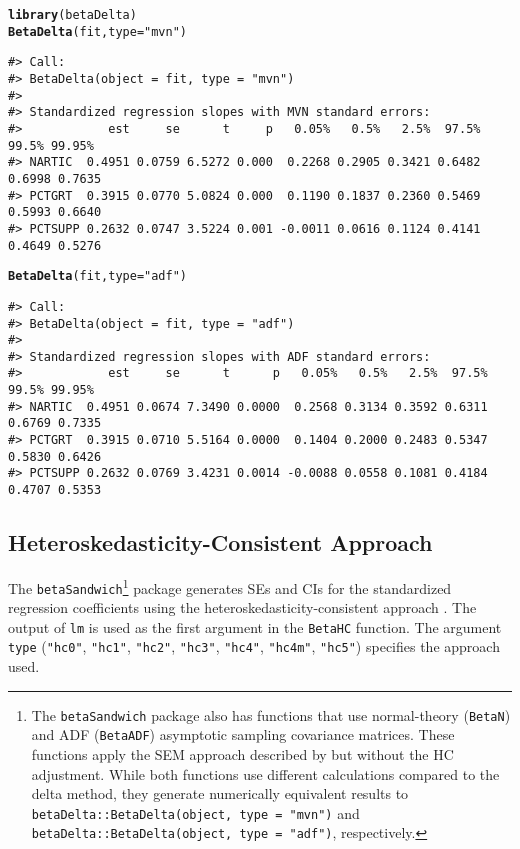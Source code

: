 \documentclass[man]{apa7}\usepackage[]{graphicx}\usepackage[]{xcolor}
\makeatletter
\newcommand{\hlstr}[1]{\textcolor[rgb]{0.192,0.494,0.8}{#1}}%
\newcommand{\hlstd}[1]{\textcolor[rgb]{0.345,0.345,0.345}{#1}}%
\newcommand{\hlkwc}[1]{\textcolor[rgb]{0.333,0.667,0.333}{#1}}%
\newcommand{\hlkwd}[1]{\textcolor[rgb]{0.737,0.353,0.396}{\textbf{#1}}}%
\newenvironment{kframe}{%
 \def\at@end@of@kframe{}%
 \ifinner\ifhmode%
  \def\at@end@of@kframe{\end{minipage}}%
  \begin{minipage}{\columnwidth}%
 \fi\fi%
 \def\FrameCommand##1{\hskip\@totalleftmargin \hskip-\fboxsep
 \colorbox{shadecolor}{##1}\hskip-\fboxsep
     \hskip-\linewidth \hskip-\@totalleftmargin \hskip\columnwidth}%
 \MakeFramed {\advance\hsize-\width
   \@totalleftmargin\z@ \linewidth\hsize
   \@setminipage}}%
 {\par\unskip\endMakeFramed%
 \at@end@of@kframe}
\newenvironment{knitrout}{}{} %
\makeatother
\begin{document}
\vspace{-.5em}
\begin{minipage}{.75\linewidth}
	\singlespacing
\begin{knitrout}\scriptsize
{}\color{fgcolor}\begin{kframe}
\begin{alltt}
\hlkwd{library}\hlstd{(betaDelta)}
\hlkwd{BetaDelta}\hlstd{(fit,} \hlkwc{type} \hlstd{=} \hlstr{"mvn"}\hlstd{)}
\end{alltt}
\begin{verbatim}
#> Call:
#> BetaDelta(object = fit, type = "mvn")
#>
#> Standardized regression slopes with MVN standard errors:
#>            est     se      t     p   0.05%   0.5%   2.5%  97.5%  99.5% 99.95%
#> NARTIC  0.4951 0.0759 6.5272 0.000  0.2268 0.2905 0.3421 0.6482 0.6998 0.7635
#> PCTGRT  0.3915 0.0770 5.0824 0.000  0.1190 0.1837 0.2360 0.5469 0.5993 0.6640
#> PCTSUPP 0.2632 0.0747 3.5224 0.001 -0.0011 0.0616 0.1124 0.4141 0.4649 0.5276
\end{verbatim}
\begin{alltt}
\hlkwd{BetaDelta}\hlstd{(fit,} \hlkwc{type} \hlstd{=} \hlstr{"adf"}\hlstd{)}
\end{alltt}
\begin{verbatim}
#> Call:
#> BetaDelta(object = fit, type = "adf")
#>
#> Standardized regression slopes with ADF standard errors:
#>            est     se      t      p   0.05%   0.5%   2.5%  97.5%  99.5% 99.95%
#> NARTIC  0.4951 0.0674 7.3490 0.0000  0.2568 0.3134 0.3592 0.6311 0.6769 0.7335
#> PCTGRT  0.3915 0.0710 5.5164 0.0000  0.1404 0.2000 0.2483 0.5347 0.5830 0.6426
#> PCTSUPP 0.2632 0.0769 3.4231 0.0014 -0.0088 0.0558 0.1081 0.4184 0.4707 0.5353
\end{verbatim}
\end{kframe}
\end{knitrout}
\end{minipage}

\subsection{Heteroskedasticity-Consistent Approach}

The \texttt{betaSandwich}\footnote{The \texttt{betaSandwich} package also has functions that use normal-theory (\texttt{BetaN}) and ADF (\texttt{BetaADF}) asymptotic sampling covariance matrices.
These functions apply the SEM approach described by \Textcite{Lib-Regression-Standardized-Coefficients-HC-Dudgeon-2017}
but without the HC adjustment.
While both functions use different calculations compared to the delta method, they generate numerically equivalent results to \texttt{betaDelta::BetaDelta(object, type = "mvn")} and \texttt{betaDelta::BetaDelta(object, type = "adf")}, respectively.} package
generates SEs and CIs
for the standardized regression coefficients
using the heteroskedasticity-consistent approach
\parencite{Lib-Regression-Standardized-Coefficients-HC-Dudgeon-2017}.
The output of \texttt{lm}
is used as the first argument in the \texttt{BetaHC} function.
The argument \texttt{type}
(\texttt{"hc0"},
\texttt{"hc1"},
\texttt{"hc2"},
\texttt{"hc3"},
\texttt{"hc4"},
\texttt{"hc4m"},
\texttt{"hc5"})
specifies the approach used.
\end{document}
